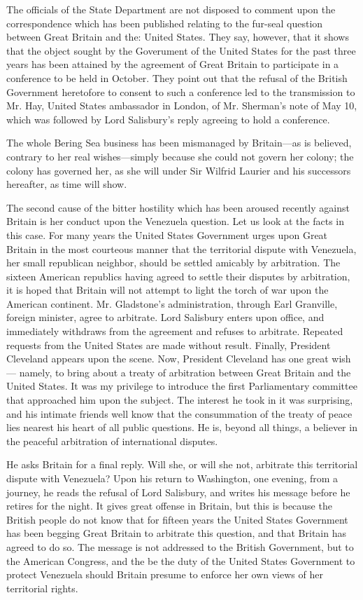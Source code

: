 \documentclass[11pt,openany]{book}
\begin{document}
The officials of the State Department are not disposed to comment upon the correspondence which has been published relating to the fur-seal question between Great Britain and the: United States. They say, however, that it shows that the object sought by the Goverument of the United States for the past three years has been attained by the agreement of Great Britain to participate in a conference to be held in October. They point out that the refusal of the British Government heretofore to consent to such a conference led to the transmission to Mr. Hay, United States ambassador in London, of Mr. Sherman's note of May 10, which was followed by Lord Salisbury's reply agreeing to hold a conference.

The whole Bering Sea business has been mismanaged by Britain---as is believed, contrary to her real wishes---simply because she could not govern her colony; the colony has governed her, as she will under Sir Wilfrid Laurier and his successors hereafter, as time will show.

The second cause of the bitter hostility which has been aroused recently against Britain is her conduct upon the Venezuela question. Let us look at the facts in this case. For many years the United States Government urges upon Great Britain in the most courteous manner that the territorial dispute with Venezuela, her small republican neighbor, should be settled amicably by arbitration. The sixteen American republics having agreed to settle their disputes by arbitration, it is hoped that Britain will not attempt to light the torch of war upon the American continent. Mr. Gladstone's administration, through Earl Granville, foreign minister, agree to arbitrate. Lord Salisbury enters upon office, and immediately withdraws from the agreement and refuses to arbitrate. Repeated requests from the United States are made without result. Finally, President Cleveland appears upon the scene. Now, President Cleveland has one great wish --- namely, to bring about a treaty of arbitration between Great Britain and the United States. It was my privilege to introduce the first Parliamentary committee that approached him upon the subject. The interest he took in it was surprising, and his intimate friends well know that the consummation of the treaty of peace lies nearest his heart of all public questions. He is, beyond all things, a believer in the peaceful arbitration of international disputes.

He asks Britain for a final reply. Will she, or will she not, arbitrate this territorial dispute with Venezuela? Upon his return to Washington, one evening, from a journey, he reads the refusal of Lord Salisbury, and writes his message before he retires for the night. It gives great offense in Britain, but this is because the British people do not know that for fifteen years the United States Government has been begging Great Britain to arbitrate this question, and that Britain has agreed to do so. The message is not addressed to the British Government, but to the American Congress, and the be the duty of the United States Government to protect Venezuela should Britain presume to enforce her own views of her territorial rights.
\end{document}
